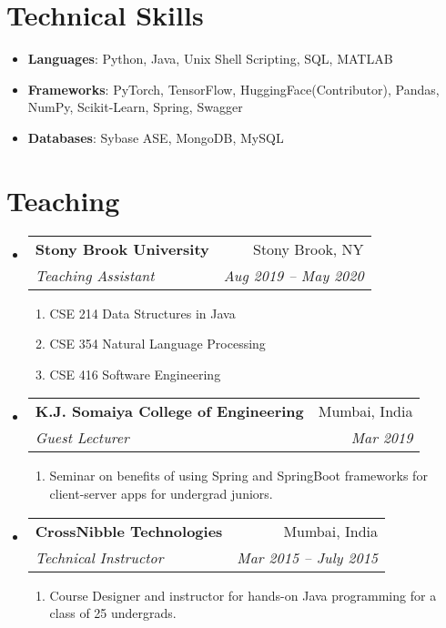 \documentclass[letterpaper,11pt]{article}
\makeatletter
\newcommand{\resumeItem}[2]{
  \item\small{
    \textbf{#1}{: #2 \vspace{-2pt}}
  }
}
\newcommand{\resumeSubheading}[4]{
  \vspace{-1pt}\item
    \begin{tabular*}{0.97\textwidth}{l@{\extracolsep{\fill}}r}
      \textbf{#1} & #2 \\
      \textit{\small#3} & \textit{\small #4} \\
    \end{tabular*}\vspace{-5pt}
}
\newcommand{\resumeSubItem}[2]{\resumeItem{#1}{#2}\vspace{-4pt}}
\newcommand{\resumeSubHeadingListStart}{\begin{itemize}[leftmargin=*]}
\newcommand{\resumeSubHeadingListEnd}{\end{itemize}}
\def\faGears{\unichar{"F085}}
\def\faClipboard{\unichar{"F0EA}}
\makeatother
\begin{document}
\section{{\faGears} Technical Skills}
 \resumeSubHeadingListStart
 \resumeSubItem{Languages}{Python, Java, Unix Shell Scripting, SQL, MATLAB}
 \resumeSubItem{Frameworks}{PyTorch, TensorFlow, HuggingFace(Contributor), Pandas, NumPy, Scikit-Learn, Spring, Swagger}
 \resumeSubItem{Databases}{Sybase ASE, MongoDB, MySQL}
 \resumeSubHeadingListEnd
 
 
\section{{\faClipboard} Teaching}
 \resumeSubHeadingListStart
    \resumeSubheading
      {Stony Brook University}{Stony Brook, NY}
      {Teaching Assistant}{Aug 2019 -- May 2020}
\begin{enumerate}[label={}, labelsep=0pt, leftmargin=0pt]
    \item CSE 214 Data Structures in Java
    \item CSE 354 Natural Language Processing
    \item CSE 416 Software Engineering
\end{enumerate}
      
\resumeSubheading
      {K.J. Somaiya College of Engineering}{Mumbai, India}
      {Guest Lecturer}{Mar 2019}
\begin{enumerate}[label={}, labelsep=0pt, leftmargin=0pt]
    \item Seminar on benefits of using Spring and SpringBoot frameworks for client-server apps for undergrad juniors.
\end{enumerate}

\resumeSubheading
      {CrossNibble Technologies}{Mumbai, India}
      {Technical Instructor}{Mar 2015 -- July 2015}
      
\begin{enumerate}[label={}, labelsep=0pt, leftmargin=0pt]
    \item Course Designer and instructor for hands-on Java programming for a class of 25 undergrads.
\end{enumerate}

\resumeSubHeadingListEnd
\end{document}
